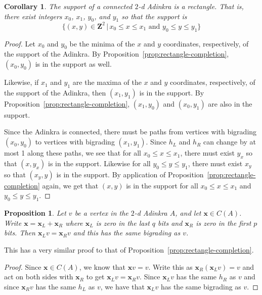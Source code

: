 \documentclass[12pt,twoside,singlespace]{article}
\numberwithin{equation}{section}
\newtheorem{cor}[equation]{Corollary}
\newtheorem{prop}[equation]{Proposition}
\theoremstyle{definition}
\newcommand{\ZZ}{\mathbf{Z}}
\renewcommand{\vec}[1]{\mathbf{#1}}
\begin{document}
\begin{cor}
\label{cor:rectangle}
The support of a connected $2$-d Adinkra is a rectangle.  That is, there exist integers $x_0$, $x_1$, $y_0$, and $y_1$ so that the support is
\[\{(x,y)\in\ZZ^2\,|\,x_0\le x\le x_1\mbox{ and }y_0\le y\le y_1\}\]
\end{cor}
\begin{proof}
Let $x_0$ and $y_0$ be the minima of the $x$ and $y$ coordinates, respectively, of the support of the Adinkra.  By Proposition~\ref{prop:rectangle-completion}, $(x_0,y_0)$ is in the support as well.

Likewise, if $x_1$ and $y_1$ are the maxima of the $x$ and $y$ coordinates, respectively, of the support of the Adinkra, then $(x_1,y_1)$ is in the support.  By Proposition~\ref{prop:rectangle-completion}, $(x_1,y_0)$ and $(x_0,y_1)$ are also in the support.

Since the Adinkra is connected, there must be paths from vertices with bigrading $(x_0,y_0)$ to vertices with bigrading $(x_1,y_1)$.  Since $h_L$ and $h_R$ can change by at most 1 along these paths, we see that for all $x_0\le x\le x_1$, there must exist $y_x$ so that $(x,y_x)$ is in the support.  Likewise for all $y_0\le y\le y_1$, there must exist $x_y$ so that $(x_y,y)$ is in the support.  By application of Proposition~\ref{prop:rectangle-completion} again, we get that $(x,y)$ is in the support for all $x_0\le x\le x_1$ and $y_0\le y\le y_1$.
\end{proof}

\begin{prop}
\label{prop:heightcode}
Let $v$ be a vertex in the $2$-d Adinkra $A$, and let $\vec{x}\in C(A)$.  Write $\vec{x}=\vec{x}_L+\vec{x}_R$ where $\vec{x}_L$ is zero in the last $q$ bits and $\vec{x}_R$ is zero in the first $p$ bits.  Then $\vec{x}_L v=\vec{x}_R v$ and this has the same bigrading as $v$.
\end{prop}
This has a very similar proof to that of Proposition~\ref{prop:rectangle-completion}.

\begin{proof}
Since $\vec{x}\in C(A)$, we know that $\vec{x}v=v$.  Write this as $\vec{x}_R(\vec{x}_L v)=v$ and act on both sides with $\vec{x}_R$ to get $\vec{x}_L v = \vec{x}_R v$.  Since $\vec{x}_L v$ has the same $h_R$ as $v$ and since $\vec{x}_R v$ has the same $h_L$ as $v$, we have that $\vec{x}_L v$ has the same bigrading as $v$.
\end{proof}
\end{document}
